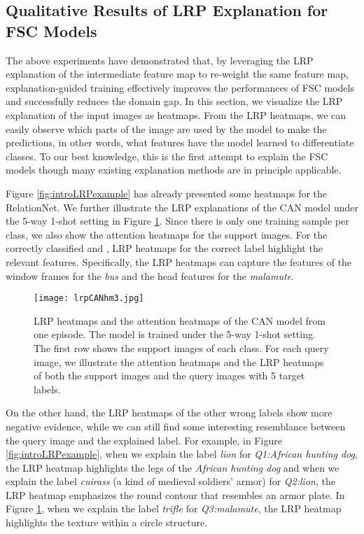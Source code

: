 \documentclass[a4paper,conference]{IEEEtran}
\begin{document}
\subsection{Qualitative Results of LRP Explanation for FSC Models}

The above experiments have demonstrated that, by leveraging the LRP explanation of the intermediate feature map to re-weight the same feature map, explanation-guided training effectively improves the performances of FSC models and successfully reduces the domain gap. In this section, we visualize the LRP explanation of the input images as heatmaps. From the LRP heatmaps, we can easily observe which parts of the image are used by the model to make the predictions, in other words, what features have the model learned to differentiate classes. To our best knowledge, this is the first attempt to explain the FSC models though many existing explanation methods are in principle applicable. 

Figure \ref{fig:introLRPexample} has already presented some heatmaps for the RelationNet. We further illustrate the LRP explanations of the CAN model under the 5-way 1-shot setting in Figure \ref{fig:visualizationCAN}. Since there is only one training sample per class, we also show the attention heatmaps for the support images. 
For the correctly classified  and , LRP heatmaps for the correct label highlight the relevant features. Specifically, the LRP heatmaps can capture the features of the window frames for the \textit{bus} and the head features for the \textit{malamute}.
\begin{figure}[tb]
    \centering
    \texttt{[image: lrpCANhm3.jpg]}
    \caption{LRP heatmaps and the attention heatmaps of the CAN model from one episode. The model is trained under the 5-way 1-shot setting. The first row shows the support images of each class. For each query image, we illustrate the attention heatmaps and the LRP heatmaps of both the support images and the query images with 5 target labels.}
    \label{fig:visualizationCAN}
\end{figure}

On the other hand, the LRP heatmaps of the other wrong labels show more negative evidence, while we can still find some interesting resemblance between the query image and the explained label. For example, in Figure \ref{fig:introLRPexample}, when we explain the label \textit{lion} for \textit{Q1:African hunting dog}, the LRP heatmap highlights the legs of the \textit{African hunting dog} and when we explain the label \textit{cuirass} (a kind of medieval soldiers' armor) for \textit{Q2:lion}, the LRP heatmap emphasizes the round contour that resembles an armor plate. In Figure \ref{fig:visualizationCAN}, when we explain the label \textit{trifle} for \textit{Q3:malamute}, the LRP heatmap highlights the texture within a circle structure. 
\end{document}
